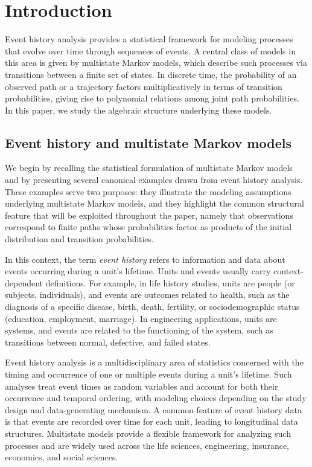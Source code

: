 \documentclass[11pt, a4paper]{article}
\numberwithin{equation}{section}
\theoremstyle{plain}
\theoremstyle{definition}
\renewcommand{\emph}[1]{\textit{#1}}
\begin{document}
\section{Introduction}\label{sec:Intro}
Event history analysis provides a statistical framework for modeling processes that evolve over time
through sequences of events. A central class of models in this area is given by multistate Markov
models, which describe such processes via transitions between a finite set of states. In discrete
time, the probability of an observed path or a trajectory factors multiplicatively in terms of transition
probabilities, giving rise to polynomial relations among joint path probabilities. In this paper, we
study the algebraic structure underlying these models.



\subsection{Event history and multistate Markov models}
We begin by recalling the statistical formulation of multistate Markov models and by presenting several canonical examples drawn from event history analysis. These examples serve two purposes: they illustrate the modeling assumptions underlying multistate Markov models, and they highlight the common structural feature that will be exploited throughout the paper, namely that observations correspond to finite paths whose probabilities factor as products of the initial distribution and transition probabilities.





In this context, the term \emph{event history} refers to information and data about events occurring during a unit’s lifetime.
Units and events usually carry context-dependent definitions. For example, in life history studies, units are people (or subjects, individuals), and events are outcomes related to health, such as the diagnosis of a specific disease, birth, death, fertility, or sociodemographic status (education, employment, marriage). In engineering applications, units are systems, and events are related to the functioning of the system, such as transitions between normal, defective, and failed states.
 

Event history analysis is a multidisciplinary area of statistics concerned with the timing and occurrence of one or multiple events during a unit’s lifetime. Such analyses treat event times as random variables and account for both their occurrence and temporal ordering, with modeling choices depending on the study design and data-generating mechanism. A common feature of event history data is that events are recorded over time for each unit, leading to longitudinal data structures. Multistate models provide a flexible framework for analyzing such processes and are widely used across the life sciences, engineering, insurance, economics, and social sciences.
\end{document}
